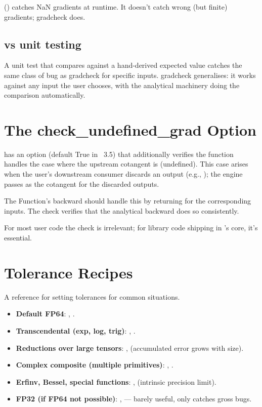 () catches NaN gradients at runtime. It
doesn't catch wrong (but finite) gradients; gradcheck does.

\subsection{vs unit testing}
\label{ssec:gradcheck:vs_unit}

A unit test that compares against a hand-derived expected value
catches the same class of bug as gradcheck for specific inputs.
gradcheck generalises: it works against any input the user
chooses, with the analytical machinery doing the comparison
automatically.

\section{The check\_undefined\_grad Option}
\label{sec:gradcheck:undefined_grad}

 has an option 
(default True in \Lucid\ 3.5) that additionally verifies the
function handles the case where the upstream cotangent is
 (undefined). This case arises when the user's
downstream consumer discards an output (e.g., ); the engine passes  as the
cotangent for the discarded outputs.

The Function's backward should handle this by returning
 for the corresponding inputs. The check verifies
that the analytical backward does so consistently.

For most user code the check is irrelevant; for library code
shipping in \Lucid's core, it's essential.

\section{Tolerance Recipes}
\label{sec:gradcheck:tolerance_recipes}

A reference for setting tolerances for common situations.

\begin{itemize}
  \item \textbf{Default FP64}: , .
  \item \textbf{Transcendental (exp, log, trig)}: ,
    .
  \item \textbf{Reductions over large tensors}: ,
     (accumulated error grows with size).
  \item \textbf{Complex composite (multiple primitives)}:
    , .
  \item \textbf{Erfinv, Bessel, special functions}:
    ,  (intrinsic precision
    limit).
  \item \textbf{FP32 (if FP64 not possible)}: ,
     --- barely useful, only catches gross bugs.
\end{itemize}

